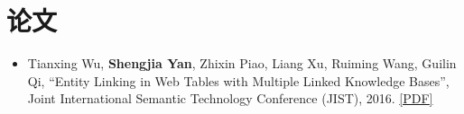 \section{论文}
\begin{itemize}
  \item Tianxing Wu, \textbf{Shengjia Yan}, Zhixin Piao, Liang Xu, Ruiming Wang, Guilin Qi, ``Entity Linking in Web Tables with Multiple Linked Knowledge Bases'', Joint International Semantic Technology Conference (JIST), 2016. \href{http://yanshengjia.com/file/jist2016.pdf}{[\underline{PDF}]}
\end{itemize}